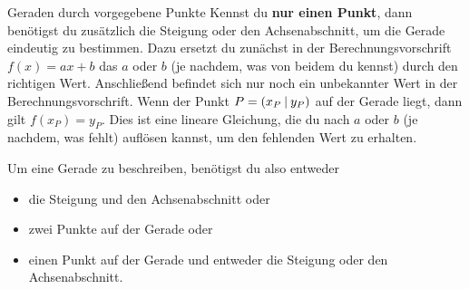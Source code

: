 \documentclass[../../main.tex]{subfiles}
\begin{document}
\begin{nutshell}{Geraden durch vorgegebene Punkte}
    Kennst du \textbf{nur einen Punkt}, dann benötigst du zusätzlich die Steigung oder den Achsenabschnitt, um die Gerade eindeutig zu bestimmen. Dazu ersetzt du zunächst in der Berechnungsvorschrift $f(x)=ax+b$ das $a$ oder $b$ (je nachdem, was von beidem du kennst) durch den richtigen Wert. Anschließend befindet sich nur noch ein unbekannter Wert in der Berechnungsvorschrift. Wenn der Punkt $P=\left(x_P \:\middle|\: y_P\right)$ auf der Gerade liegt, dann gilt $f(x_P)=y_P$. Dies ist eine lineare Gleichung, die du nach $a$ oder $b$ (je nachdem, was fehlt) auflösen kannst, um den fehlenden Wert zu erhalten.

    Um eine Gerade zu beschreiben, benötigst du also entweder
    \begin{itemize}
        \item die Steigung und den Achsenabschnitt oder
        \item zwei Punkte auf der Gerade oder
        \item einen Punkt auf der Gerade und entweder die Steigung oder den Achsenabschnitt.
    \end{itemize}
\end{nutshell}
\end{document}
